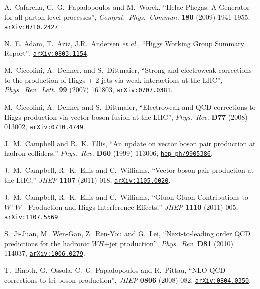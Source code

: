 \documentclass[english,12pt]{article}
\begin{document}
\begin{thebibliography}{10}
  A.~Cafarella, C.~G.~Papadopoulos and M.~Worek,
  ``{Helac-Phegas: A Generator for all parton level processes}'',
  {\em Comput.\ Phys.\ Commun.}  {\bf 180} (2009)  1941-1955,
 \href{http://arxiv.org/abs/0710.2427} {{\tt arXiv:0710.2427}}.

N.~E. Adam, T.~Aziz, J.R.~Andersen {\em et al.}, ``{Higgs Working Group Summary Report}'',
\href{http://www.arXiv.org/abs/0803.1154}{{\tt arXiv:0803.1154}}.

M.~Ciccolini, A.~Denner, and S.~Dittmaier, ``{Strong and electroweak
  corrections to the production of Higgs + 2 jets via weak interactions at the
  LHC}'', {\em Phys.\ Rev.\ Lett.}~{\bf 99} (2007) 161803,
\href{http://www.arXiv.org/abs/0707.0381}{{\tt arXiv:0707.0381}}.

M.~Ciccolini, A.~Denner and S.~Dittmaier, ``{Electroweak and QCD corrections
  to Higgs production via vector-boson fusion at the LHC}'', {\em Phys.\ Rev.}
  {\bf D77} (2008) 013002,
\href{http://www.arXiv.org/abs/0710.4749}{{\tt arXiv:0710.4749}}.

  J.~M.~Campbell and R.~K.~Ellis,
  ``An update on vector boson pair production at hadron colliders,''
  {\em Phys.\ Rev.} {\bf D60} (1999) 113006,
  \href{http://www.arXiv.org/abs/hep-ph/9905386}{{\tt hep-ph/9905386}}.

  J.~M.~Campbell, R.~K.~Ellis and C.~Williams,
  ``Vector boson pair production at the LHC,''
  {\em JHEP} {\bf 1107} (2011) 018,
  \href{http://www.arXiv.org/abs/1105.0020}{{\tt arXiv:1105.0020}}.

  J.~M.~Campbell, R.~K.~Ellis and C.~Williams,
  ``Gluon-Gluon Contributions to $W^{+}W^{-}$ Production and Higgs Interference Effects,''
  {\em JHEP} {\bf 1110} (2011) 005,
  \href{http://www.arXiv.org/abs/1107.5569}{{\tt arXiv:1107.5569}}.

  S.~Ji-Juan, M.~Wen-Gan, Z.~Ren-You and G.~Lei,
  ``{Next-to-leading order QCD predictions for the hadronic $WH$+jet production}'',
  {\em Phys.\ Rev.} {\bf D81} (2010) 114037,
\href{http://www.arXiv.org/abs/1006.0279}{{\tt arXiv:1006.0279}}.

T.~Binoth, G.~Ossola, C.~G. Papadopoulos and R.~Pittau, ``{NLO QCD corrections
  to tri-boson production}'', {\em JHEP} {\bf 0806} (2008) 082,
\href{http://www.arXiv.org/abs/0804.0350}{{\tt arXiv:0804.0350}}.


\end{thebibliography}
\end{document}
